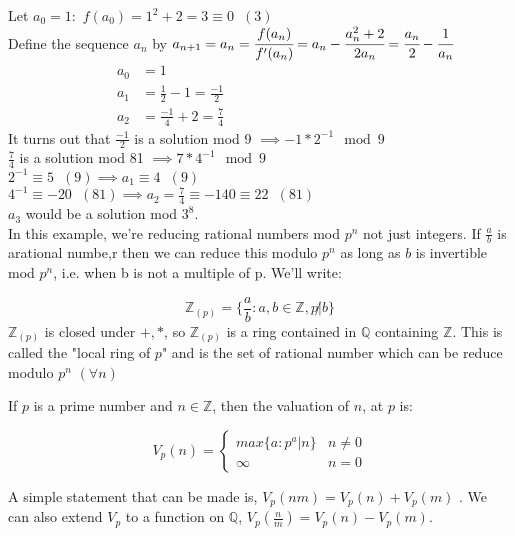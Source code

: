 \documentclass[11pt]{article}
\begin{document}
Let $a_0 = 1: $ $f(a_0) = 1^2 + 2 = 3 \equiv 0 \hspace{7pt} (3)$\\[0.5em]
Define the sequence $a_n$ by $a_{n+1} = a_n = \cfrac{f(a_n)}{f'(a_n)}=a_n - \cfrac{a_n^2 +2}{2a_n} = \cfrac{a_n}{2} - \cfrac{1}{a_n}$
\begin{align*}
	a_0 &= 1 &&&&&&&&&&&&&&&&\\
	a_1 &= \frac{1}{2} -1 = \frac{-1}{2} \\
	a_2 &= \frac{-1}{4} +2 = \frac{7}{4}
\end{align*}
It turns out that $ \frac{-1}{2} $ is a solution mod 9 $\implies -1 *2^{-1} \mod 9$\\
\hspace{75pt} $\frac{7}{4} $ is a solution mod 81 $\implies 7*4^{-1} \mod 9$\\[0.5em]
$2^{-1} \equiv 5 \hspace{7pt} (9) \implies a_1 \equiv 4 \hspace{7pt} (9) $\\[0.5em]
$4^{-1} \equiv -20 \hspace{7pt} (81) \implies  a_2 = \frac{7}{4} \equiv -140 \equiv 22\hspace{7pt} (81)$\\[1em]
$a_3 $ would be a solution mod $3^8$.\\[1em]
In this example, we're reducing rational numbers mod $p^n$ not just integers. If $\frac{a}{b}$ is arational numbe,r then we can reduce this modulo $p^n$ as long as $b$ is invertible mod $p^n$, i.e. when b is not a multiple of p. We'll write:

\begin{equation*}
	\mathbb{Z}_{(p)} = \{\frac{a}{b} : a,b \in \mathbb{Z}, p \not | b\}
\end{equation*}
$\mathbb{Z}_{(p)} $ is closed under $+, *$, so $\mathbb{Z}_{(p)}$ is a ring contained in $\mathbb{Q}$ containing $\mathbb{Z}$. This is called the "local ring of $p$" and is the set of rational number which can be reduce modulo $p^n$ $(\forall n)$


\begin{definition}
	If $p$ is a prime number and $n \in \mathbb{Z}$, then the valuation of $n$, at $p$ is:

	\begin{equation*}
		V_{p}(n) = 
		\begin{cases}
	max\{a:  p^a | n\} & n \neq 0\\
			\infty & n=0
		\end{cases}
	\end{equation*}
\end{definition}
A simple statement that can be made is, $V_{p}(nm) = V_p(n) + V_p(m)$ .
We can also extend $V_p$ to a function on $\mathbb{Q}$, $V_p(\frac{n}{m}) = V_p(n) - V_p(m)$.
\end{document}

